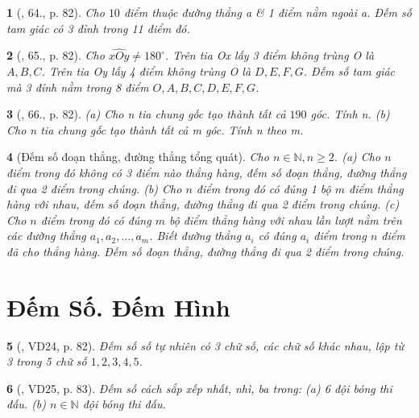 \documentclass{article}
\newtheorem{baitoan}{}
\begin{document}
\begin{baitoan}[\cite{Binh_Toan_6_tap_2}, 64., p. 82]
	Cho $10$ điểm thuộc đường thẳng a \& 1 điểm nằm ngoài a. Đếm số tam giác có 3 đỉnh trong 11 điểm đó.
\end{baitoan}

\begin{baitoan}[\cite{Binh_Toan_6_tap_2}, 65., p. 82]
	Cho $\widehat{xOy}\ne180^\circ$. Trên tia Ox lấy 3 điểm không trùng O là $A,B,C$. Trên tia Oy lấy 4 điểm không trùng O là $D,E,F,G$. Đếm số tam giác mà 3 đỉnh nằm trong 8 điểm $O,A,B,C,D,E,F,G$.
\end{baitoan}

\begin{baitoan}[\cite{Binh_Toan_6_tap_2}, 66., p. 82]
	(a) Cho n tia chung gốc tạo thành tất cả $190$ góc. Tính n. (b) Cho n tia chung gốc tạo thành tất cả m góc. Tính n theo m.
\end{baitoan}

\begin{baitoan}[Đếm số đoạn thẳng, đường thẳng tổng quát]
	Cho $n\in\mathbb{N},n\ge2$. (a) Cho $n$ điểm trong đó không có 3 điểm nào thẳng hàng, đếm số đoạn thẳng, đường thẳng đi qua 2 điểm trong chúng. (b) Cho $n$ điểm trong đó có đúng 1 bộ $m$ điểm thẳng hàng với nhau, đếm số đoạn thẳng, đường thẳng đi qua 2 điểm trong chúng. (c) Cho $n$ điểm trong đó có đúng $m$ bộ điểm thẳng hàng với nhau lần lượt nằm trên các đường thẳng $a_1,a_2,\ldots,a_m$. Biết đường thẳng $a_i$ có đúng $a_i$ điểm trong $n$ điểm đã cho thẳng hàng. Đếm số đoạn thẳng, đường thẳng đi qua 2 điểm trong chúng.
\end{baitoan}


\section{Đếm Số. Đếm Hình}

\begin{baitoan}[\cite{Binh_Toan_6_tap_2}, VD24, p. 82]
	Đếm số số tự nhiên có 3 chữ số, các chữ số khác nhau, lập từ 3 trong 5 chữ số $1,2,3,4,5$.
\end{baitoan}

\begin{baitoan}[\cite{Binh_Toan_6_tap_2}, VD25, p. 83]
	Đếm số cách sắp xếp nhất, nhì, ba trong: (a) 6 đội bóng thi đấu. (b) $n\in\mathbb{N}$ đội bóng thi đấu.
\end{baitoan}
\end{document}
